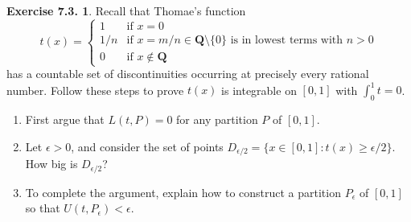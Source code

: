 \documentclass[12pt]{article}
\theoremstyle{definition}
\theoremstyle{exercise}
\newtheorem{exercise}{Exercise 7.3.}
\theoremstyle{solution}
\newcommand{\Q}{\mathbf{Q}}
\begin{document}
\begin{exercise}
\label{ex:2}
    Recall that Thomae's function
    \[
        t(x) = \begin{cases}
            1 & \text{if } x = 0 \\
            1/n & \text{if } x = m/n \in \Q \setminus \{ 0 \} \text{ is in lowest terms with } n > 0 \\
            0 & \text{if } x \not\in \Q
        \end{cases}
    \]
    has a countable set of discontinuities occurring at precisely every rational number. Follow these steps to prove \( t(x) \) is integrable on \( [0, 1] \) with \( \int_0^1 t = 0 \).
    \begin{enumerate}
        \item First argue that \( L(t, P) = 0 \) for any partition \( P \) of \( [0, 1] \).
        
        \item Let \( \epsilon > 0 \), and consider the set of points \( D_{\epsilon/2} = \{ x \in [0, 1] : t(x) \geq \epsilon/2 \} \). How big is \( D_{\epsilon/2} \)?

        \item To complete the argument, explain how to construct a partition \( P_{\epsilon} \) of \( [0, 1] \) so that \( U(t, P_{\epsilon}) < \epsilon \).
    \end{enumerate}
\end{exercise}
\end{document}
